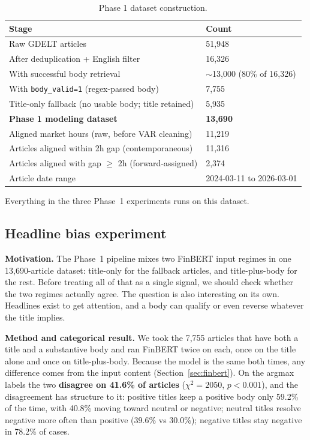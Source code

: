 \begin{table}[h]
  \centering
  \caption{Phase 1 dataset construction.}
  \label{tab:phase1-data}
  \begin{tabular}{@{}p{9cm}l@{}}
    \toprule
    Stage & Count \\
    \midrule
    Raw GDELT articles & 51{,}948 \\
    After deduplication + English filter & 16{,}326 \\
    With successful body retrieval & $\sim$13{,}000 (80\% of 16{,}326) \\
    With \texttt{body\_valid=1} (regex-passed body) & 7{,}755 \\
    Title-only fallback (no usable body; title retained) & 5{,}935 \\
    \textbf{Phase 1 modeling dataset} & \textbf{13{,}690} \\
    Aligned market hours (raw, before VAR cleaning) & 11{,}219 \\
    Articles aligned within 2h gap (contemporaneous) & 11{,}316 \\
    Articles aligned with gap $\geq$ 2h (forward-assigned) & 2{,}374 \\
    Article date range & 2024-03-11 to 2026-03-01 \\
    \bottomrule
  \end{tabular}
\end{table}

Everything in the three Phase~1 experiments runs on this dataset.

\subsection{Headline bias experiment}\label{sec:headline-bias}

\textbf{Motivation.} The Phase~1 pipeline mixes two FinBERT input regimes in one 13{,}690-article dataset: title-only for the fallback articles, and title-plus-body for the rest. Before treating all of that as a single signal, we should check whether the two regimes actually agree. The question is also interesting on its own. Headlines exist to get attention, and a body can qualify or even reverse whatever the title implies.

\textbf{Method and categorical result.} We took the 7{,}755 articles that have both a title and a substantive body and ran FinBERT twice on each, once on the title alone and once on title-plus-body. Because the model is the same both times, any difference comes from the input content (Section~\ref{sec:finbert}). On the argmax labels the two \textbf{disagree on 41.6\% of articles} ($\chi^2 = 2050$, $p < 0.001$), and the disagreement has structure to it: positive titles keep a positive body only 59.2\% of the time, with 40.8\% moving toward neutral or negative; neutral titles resolve negative more often than positive (39.6\% vs 30.0\%); negative titles stay negative in 78.2\% of cases.

